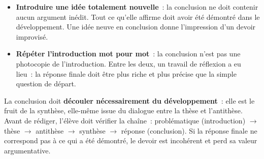 \documentclass[11pt]{article}
\begin{document}
\begin{attention}
\begin{itemize}
\item \textbf{Introduire une idée totalement nouvelle}~: la conclusion ne doit contenir aucun argument inédit. Tout ce qu'elle affirme doit avoir été démontré dans le développement. Une idée neuve en conclusion donne l'impression d'un devoir improvisé.
\item \textbf{Répéter l'introduction mot pour mot}~: la conclusion n'est pas une photocopie de l'introduction. Entre les deux, un travail de réflexion a eu lieu~: la réponse finale doit être plus riche et plus précise que la simple question de départ.
\end{itemize}
\end{attention}

\begin{propriete}
La conclusion doit \textbf{découler nécessairement du développement}~: elle est le fruit de la synthèse, elle-même issue du dialogue entre la thèse et l'antithèse. Avant de rédiger, l'élève doit vérifier la chaîne~: problématique (introduction) $\rightarrow$ thèse $\rightarrow$ antithèse $\rightarrow$ synthèse $\rightarrow$ réponse (conclusion). Si la réponse finale ne correspond pas à ce qui a été démontré, le devoir est incohérent et perd sa valeur argumentative.
\end{propriete}
\end{document}
